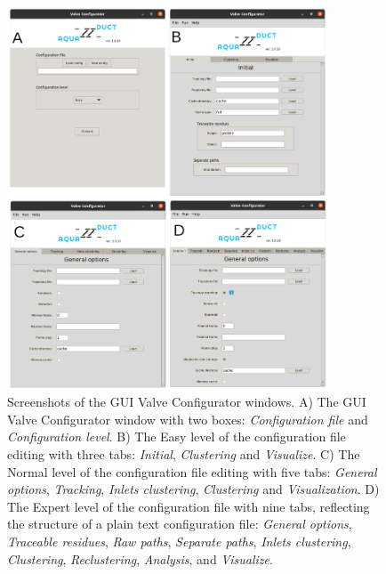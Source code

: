 \documentclass[9pt,tutorial, pubversion]{livecoms}
\begin{document}
\begin{figure}[ht!]
\centering
\includegraphics[width=0.85\textwidth]{GUI.png}
\caption{Screenshots of the GUI Valve Configurator windows. A) The GUI Valve Configurator window with two boxes: \textit{Configuration file} and \textit{Configuration level}. B) The Easy level of the configuration file editing with three tabs: \textit{Initial}, \textit{Clustering} and \textit{Visualize}. C) The Normal level of the configuration file editing with five tabs: \textit{General options}, \textit{Tracking}, \textit{Inlets clustering}, \textit{Clustering} and \textit{Visualization}. D) The Expert level of the configuration file with nine tabs, reflecting the structure of a plain text configuration file: \textit{General options}, \textit{Traceable residues}, \textit{Raw paths}, \textit{Separate paths}, \textit{Inlets clustering}, \textit{Clustering}, \textit{Reclustering}, \textit{Analysis}, and \textit{Visualize}.}
\label{GUI}
\end{figure}
\end{document}
